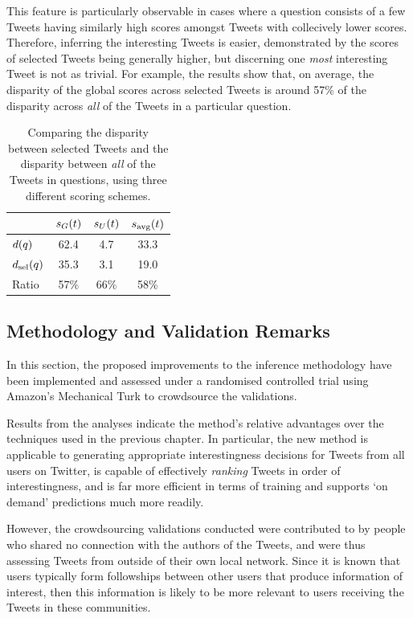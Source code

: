 This feature is particularly observable in cases where a question consists of a few Tweets having similarly high scores amongst Tweets with collecively lower scores. Therefore, inferring the interesting Tweets is easier, demonstrated by the scores of selected Tweets being generally higher, but discerning one \textit{most} interesting Tweet is not as trivial. For example, the results show that, on average, the disparity of the global scores across selected Tweets is around 57\% of the disparity across \textit{all} of the Tweets in a particular question.


\begin{table}[h]\footnotesize
\begin{center}
\begin{tabular}{ l || c | c | c }
	   & $s_G(t)$ &  $s_U(t)$ &  $s_{\textrm{avg}}(t)$\\
	 \hline
	$d(q)$ & 62.4 & 4.7 & 33.3\\
	$d_{\textrm{sel}}(q)$ & 35.3 & 3.1 & 19.0\\
	\hline
	Ratio & 57\% & 66\% & 58\%
\end{tabular}
\end{center}
\caption{Comparing the disparity between selected Tweets and the disparity between \textit{all} of the Tweets in questions, using three different scoring schemes.}
\label{table:score-disparities-2}
\end{table}


\subsection{Methodology and Validation Remarks}
In this section, the proposed improvements to the inference methodology have been implemented and assessed under a randomised controlled trial using Amazon's Mechanical Turk to crowdsource the validations.

Results from the analyses indicate the method's relative advantages over the techniques used in the previous chapter. In particular, the new method is applicable to generating appropriate interestingness decisions for Tweets from all users on Twitter, is capable of effectively \textit{ranking} Tweets in order of interestingness, and is far more efficient in terms of training and supports `on demand' predictions much more readily.

However, the crowdsourcing validations conducted were contributed to by people who shared no connection with the authors of the Tweets, and were thus assessing Tweets from outside of their own local network. Since it is known that users typically form followships between other users that produce information of interest, then this information is likely to be more relevant to users receiving the Tweets in these communities.  

